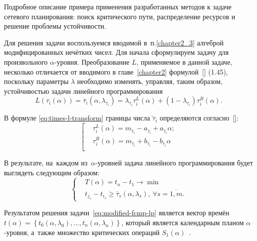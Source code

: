 Подробное описание примера применения разработанных методов к задаче сетевого планирования: поиск критического пути, распределение 
ресурсов и решение проблемы устойчивости.

Для решения задачи воспользуемся вводимой в~п.\ref{chapter2_3} алгеброй модифицированных нечётких чисел. Для начала сформулируем задачу для произвольного $\alpha$-уровня. Преобразование $L$, применяемое в данной задаче, несколько отличается от вводимого в главе~\ref{chapter2} формулой~\eqref{} (1.45), поскольку параметры $\lambda$ необходимо изменять, управляя, таким образом, устойчивостью задачи линейного программирования
\begin{equation}
\label{eq:times-l-transform}
  L(\tau_i(\alpha ))=\bar{\tau}_i\left(\alpha, \lambda_{\tau_i}\right)=\lambda_{\tau_i}\tau_{i}^{L}\left(\alpha \right)+(1-\lambda_{\tau_i})\tau_{i}^{R}\left(\alpha \right).
\end{equation}

В формуле \eqref{eq:times-l-transform} границы числа $\tilde \tau_i$ определяются согласно~\eqref{}:
\begin{equation*}
  \left[ \begin{aligned}
    & \tau_{i}^{L}\left(\alpha \right)=m_{\tilde \tau_i}-a_{\tilde \tau_i}+a_{\tilde \tau_i}\alpha; \\ 
    & \tau_{i}^{R}\left(\alpha \right)={{m}_{{{{\tilde{\tau }}}_{i}}}}+{{b}_{{{{\tilde{\tau }}}_{i}}}}-{{b}_{{{{\tilde{\tau }}}_{i}}}}\alpha  \\ 
  \end{aligned} \right.
\end{equation*}

В результате, на~каждом из~$\alpha$-уровней задача линейного программирования будет выглядеть следующим образом:
\begin{equation}
\label{eq:modified-fcmp-lp}
  \left\{ \begin{aligned}
    & T(\alpha )=t_n-t_1\to \min  \\ 
    & t_{j_s}-t_{i_s}\geqslant \bar{\tau}_s\left(\alpha,\lambda_s \right),\ \forall s=\overline{1,m}.
  \end{aligned} \right.
\end{equation}

Результатом решения задачи~\eqref{eq:modified-fcmp-lp} является вектор времён $t\left( \alpha \right)=\left\{ t_0\left(\alpha, \lambda_0\right),\ldots,t_n\left(\alpha, \lambda_n\right) \right\}$, который является календарным планом $\alpha$-уровня, а~также множество критических операций $S_1\left( \alpha \right)$~\cite{Vorontsov_VSTU}. 


